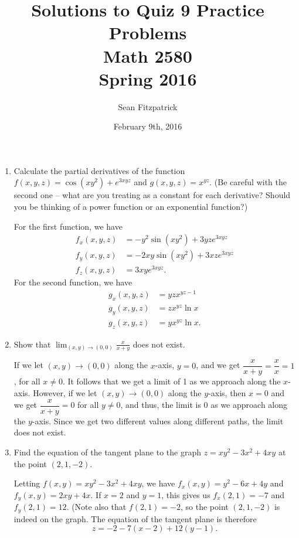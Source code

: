 \documentclass[letterpaper,12pt]{article}
\title{Solutions to Quiz 9 Practice Problems\\Math 2580\\Spring 2016}
\author{Sean Fitzpatrick}
\date{February 9th, 2016}
\begin{document}
 \maketitle


\begin{enumerate}
 \item Calculate the partial derivatives of the function $f(x,y,z) = \cos(xy^2)+e^{3xyz}$ and $g(x,y,z) = x^{yz}$. (Be careful with the second one -- what are you treating as a constant for each derivative? Should you be thinking of a power function or an exponential function?)

\bigskip

For the first function, we have
\begin{align*}
 f_x(x,y,z) &= -y^2\sin(xy^2)+3yze^{3xyz}\\
 f_y(x,y,z) &= -2xy\sin(xy^2)+3xze^{3xyz}\\
 f_z(x,y,z) & = 3xye^{3xyz}.
\end{align*}
For the second function, we have
\begin{align*}
 g_x(x,y,z)&=yzx^{yz-1}\\
 g_y(x,y,z)&=zx^{yz}\ln x\\
 g_z(x,y,z)&=yx^{yz}\ln x.
\end{align*}



 \item Show that $\displaystyle \lim_{(x,y)\to (0,0)}\frac{x}{x+y}$ does not exist.

\bigskip

If we let $(x,y)\to (0,0)$ along the $x$-axis, $y=0$, and we get $\dfrac{x}{x+y} = \dfrac{x}{x} = 1$, for all $x\neq 0$. It follows that we get a limit of 1 as we approach along the $x$-axis. However, if we let $(x,y)\to (0,0)$ along the $y$-axis, then $x=0$ and we get $\dfrac{x}{x+y} = 0$ for all $y\neq 0$, and thus, the limit is 0 as we approach along the $y$-axis. Since we get two different values along different paths, the limit does not exist.

 \item Find the equation of the tangent plane to the graph $z=xy^2-3x^2+4xy$ at the point $(2,1,-2)$.

\bigskip

Letting $f(x,y) = xy^2-3x^2+4xy$, we have $f_x(x,y) = y^2-6x+4y$ and $f_y(x,y) = 2xy+4x$. If $x=2$ and $y=1$, this gives us $f_x(2,1) = -7$ and $f_y(2,1) = 12$. (Note also that $f(2,1) = -2$, so the point $(2,1,-2)$ is indeed on the graph. The equation of the tangent plane is therefore
\[
 z = -2 -7(x-2)+12(y-1).
\]


\end{enumerate}
\end{document}
